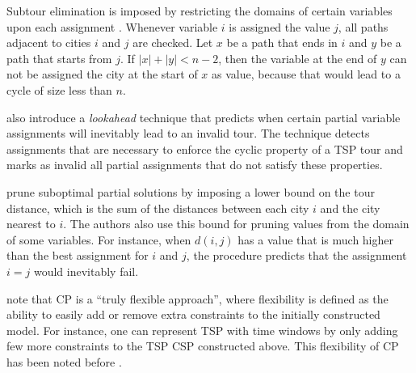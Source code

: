\documentclass{mpaper}
\begin{document}
Subtour elimination is imposed by restricting the domains of certain variables upon each assignment \cite{Caseau97}. Whenever variable $i$ is assigned the value $j$, all paths adjacent to cities $i$ and $j$ are checked. Let $x$ be a path that ends in $i$ and $y$ be a path that starts from $j$. If $|x| + |y| < n-2$, then the variable at the end of $y$ can not be assigned the city at the start of $x$ as value, because that would lead to a cycle of size less than $n$.

\citet{Caseau97} also introduce a \textit{lookahead} technique that predicts when certain partial variable assignments will inevitably lead to an invalid tour. The technique detects assignments that are necessary to enforce the cyclic property of a TSP tour and marks as invalid all partial assignments that do not satisfy these properties.



\citet{Caseau97} prune suboptimal partial solutions by imposing a lower bound on the tour distance, which is the sum of the distances between each city $i$ and the city nearest to $i$. The authors also use this bound for pruning values from the domain of some variables. For instance, when $d(i,j)$ has a value that is much higher than the best assignment for $i$ and $j$, the procedure predicts that the assignment $i = j$ would inevitably fail.

\citet{Caseau97} note that CP is a ``truly flexible approach'', where flexibility is defined as the ability to easily add or remove extra constraints to the initially constructed model. For instance, one can represent TSP with time windows by only adding few more constraints to the TSP CSP constructed above. This flexibility of CP has been noted before \cite{Kilby00, Pesant1997}.
\end{document}
